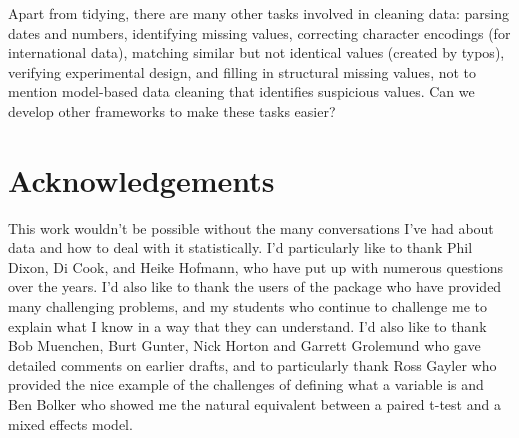 \documentclass[article]{jss}
\begin{document}
Apart from tidying, there are many other tasks involved in cleaning data: parsing dates and numbers, identifying missing values, correcting character encodings (for international data), matching similar but not identical values (created by typos), verifying experimental design, and filling in structural missing values, not to mention model-based data cleaning that identifies suspicious values. Can we develop other frameworks to make these tasks easier?


\section{Acknowledgements} 
\label{sec:acknowledgements}

This work wouldn't be possible without the many conversations I've had about data and how to deal with it statistically. I'd particularly like to thank Phil Dixon, Di Cook, and Heike Hofmann, who have put up with numerous questions over the years. I'd also like to thank the users of the  package who have provided many challenging problems, and my students who continue to challenge me to explain what I know in a way that they can understand. I'd also like to thank Bob Muenchen, Burt Gunter, Nick Horton and Garrett Grolemund who gave detailed comments on earlier drafts, and to particularly thank Ross Gayler who provided the nice example of the challenges of defining what a variable is and Ben Bolker who showed me the natural equivalent between a paired t-test and a mixed effects model.


\end{document}
